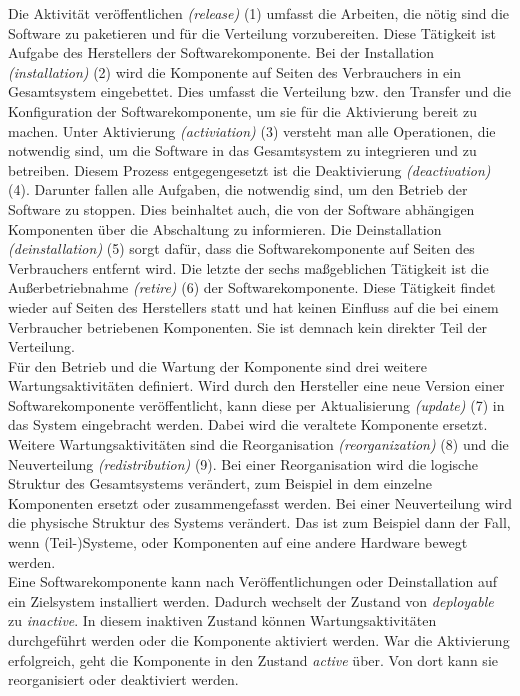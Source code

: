 Die Aktivität veröffentlichen \textit{(release)} (1) umfasst die Arbeiten, die nötig sind die Software zu paketieren und für die Verteilung vorzubereiten.
Diese Tätigkeit ist Aufgabe des Herstellers der Softwarekomponente.
Bei der Installation \textit{(installation)} (2) wird die Komponente auf Seiten des Verbrauchers in ein Gesamtsystem eingebettet. Dies umfasst die Verteilung bzw. den Transfer
und die Konfiguration der Softwarekomponente, um sie für die Aktivierung bereit zu machen.
Unter Aktivierung \textit{(activiation)} (3) versteht man alle Operationen, die notwendig sind, um die Software
in das Gesamtsystem zu integrieren und zu betreiben. Diesem Prozess entgegengesetzt ist die Deaktivierung \textit{(deactivation)} (4). Darunter
fallen alle Aufgaben, die notwendig sind, um den Betrieb der Software zu stoppen. Dies beinhaltet auch, die von der Software abhängigen 
Komponenten über die Abschaltung zu informieren. Die Deinstallation \textit{(deinstallation)} (5) sorgt dafür, dass die Softwarekomponente auf Seiten des Verbrauchers
entfernt wird.
Die letzte der sechs maßgeblichen Tätigkeit ist die Außerbetriebnahme \textit{(retire)} (6) der Softwarekomponente.
Diese Tätigkeit findet wieder auf Seiten des Herstellers statt und hat keinen Einfluss auf die bei einem Verbraucher betriebenen Komponenten.
Sie ist demnach kein direkter Teil der Verteilung.\\

Für den Betrieb und die Wartung der Komponente sind drei weitere Wartungsaktivitäten definiert.
Wird durch den Hersteller eine neue Version einer Softwarekomponente veröffentlicht, kann diese per Aktualisierung \textit{(update)} (7) in das System eingebracht werden. Dabei wird die 
veraltete Komponente ersetzt. Weitere Wartungsaktivitäten sind die Reorganisation \textit{(reorganization)} (8) und die Neuverteilung \textit{(redistribution)} (9).
Bei einer Reorganisation wird die logische Struktur des Gesamtsystems verändert, zum Beispiel in dem einzelne Komponenten ersetzt oder zusammengefasst werden.
Bei einer Neuverteilung wird die physische Struktur des Systems verändert. Das ist zum Beispiel dann der Fall, wenn (Teil-)Systeme, oder Komponenten auf eine andere Hardware bewegt werden.\\

Eine Softwarekomponente kann nach Veröffentlichungen oder Deinstallation auf ein Zielsystem installiert werden.
Dadurch wechselt der Zustand von \textit{deployable} zu \textit{inactive}.
In diesem inaktiven Zustand können Wartungsaktivitäten durchgeführt werden oder die Komponente aktiviert werden.
War die Aktivierung erfolgreich, geht die Komponente in den Zustand \textit{active} über. Von dort kann sie 
reorganisiert oder deaktiviert werden.\\

